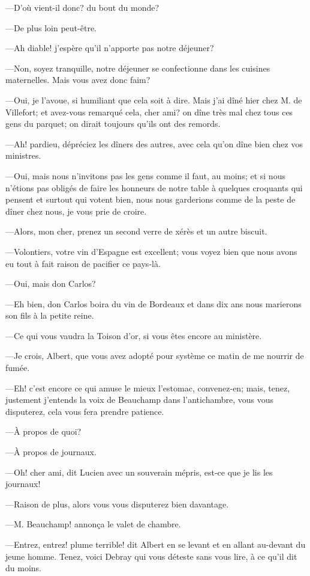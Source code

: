 —D'où vient-il donc? du bout du monde? 

—De plus loin peut-être. 

—Ah diable! j'espère qu'il n'apporte pas notre déjeuner?  

—Non, soyez tranquille, notre déjeuner se confectionne dans les cuisines maternelles. Mais vous avez donc faim? 

—Oui, je l'avoue, si humiliant que cela soit à dire. Mais j'ai dîné hier chez M. de Villefort; et avez-vous remarqué cela, cher ami? on dîne très mal chez tous ces gens du parquet; on dirait toujours qu'ils ont des remords. 

—Ah! pardieu, dépréciez les dîners des autres, avec cela qu'on dîne bien chez vos ministres. 

—Oui, mais nous n'invitons pas les gens comme il faut, au moins; et si nous n'étions pas obligés de faire les honneurs de notre table à quelques croquants qui pensent et surtout qui votent bien, nous nous garderions comme de la peste de dîner chez nous, je vous prie de croire. 

—Alors, mon cher, prenez un second verre de xérès et un autre biscuit. 

—Volontiers, votre vin d'Espagne est excellent; vous voyez bien que nous avons eu tout à fait raison de pacifier ce pays-là. 

—Oui, mais don Carlos? 

—Eh bien, don Carlos boira du vin de Bordeaux et dans dix ans nous marierons son fils à la petite reine. 

—Ce qui vous vaudra la Toison d'or, si vous êtes encore au ministère. 

—Je crois, Albert, que vous avez adopté pour système ce matin de me nourrir de fumée. 

—Eh! c'est encore ce qui amuse le mieux l'estomac, convenez-en; mais, tenez, justement j'entends la voix de Beauchamp dans l'antichambre, vous vous disputerez, cela vous fera prendre patience. 

—À propos de quoi? 

—À propos de journaux.  

—Oh! cher ami, dit Lucien avec un souverain mépris, est-ce que je lis les journaux! 

—Raison de plus, alors vous vous disputerez bien davantage. 

—M. Beauchamp! annonça le valet de chambre. 

—Entrez, entrez! plume terrible! dit Albert en se levant et en allant au-devant du jeune homme. Tenez, voici Debray qui vous déteste sans vous lire, à ce qu'il dit du moins. 

